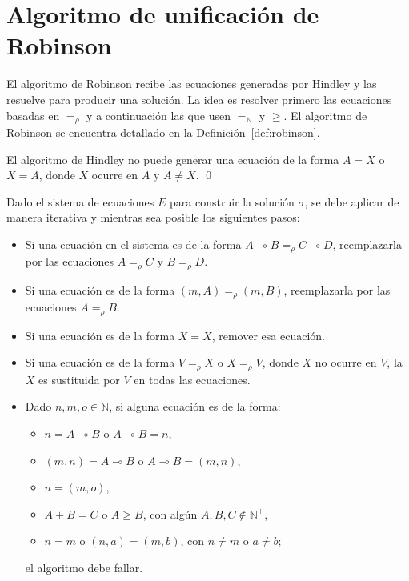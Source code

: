 \section{Algoritmo de unificación de Robinson}\label{sec:robinson}
El algoritmo de Robinson recibe las ecuaciones generadas por Hindley y las resuelve para producir una solución. La idea es resolver primero las ecuaciones basadas en $=_\rho$ y a continuación las que usen $=_\mathbb{N}$ y $\geq$. El algoritmo de Robinson se encuentra detallado en la Definición~\ref{def:robinson}.

\begin{lema}
    El algoritmo de Hindley no puede generar una ecuación de la forma $A = X$ o $X=A$, donde $X$ ocurre en $A$ y $A\neq X$.
    \qed
\end{lema}
\begin{definicion}\label{def:robinson}
Dado el sistema de ecuaciones $E$ para construir la solución $\sigma$, se debe aplicar de manera iterativa y mientras sea posible los siguientes pasos:
\begin{itemize}
    \item Si una ecuación en el sistema es de la forma $A \multimap B =_\rho C \multimap D$, reemplazarla por las ecuaciones $A =_\rho C$ y $B =_\rho D$.
    \item Si una ecuación es de la forma $(m, A) =_\rho (m, B)$, reemplazarla por las ecuaciones $A =_\rho B$.
    \item Si una ecuación es de la forma $X = X$, remover esa ecuación.
    \item Si una ecuación es de la forma $V =_\rho X$ o $X=_\rho V$, donde $X$ no ocurre en $V$, la $X$ es sustituida por $V$ en todas las ecuaciones.
    \item Dado $n,m,o \in \mathbb{N}$, si alguna ecuación es de la forma:
        \begin{itemize}
            \item $n = A \multimap B$ o $A\multimap B = n$,
            \item $(m, n) = A \multimap B$ o $A\multimap B = (m, n)$,
            \item $n = (m, o)$,
            \item $A + B = C$ o $A \geq B$, con algún $A, B, C \notin \mathbb{N}^+$,
            \item $n = m$ o $(n, a) = (m, b)$, con $n\neq m$ o $a\neq b$;
        \end{itemize}
    el algoritmo debe fallar.
\end{itemize}


\end{definicion}
